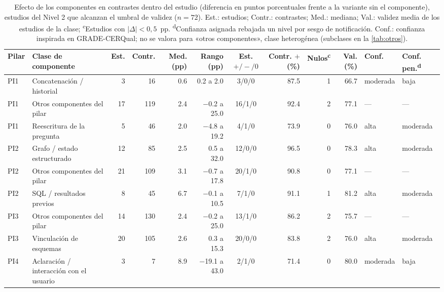 \begin{table}[!tbp]
\centering
\caption{Efecto de los componentes en contrastes dentro del estudio (diferencia en puntos porcentuales frente a la variante sin el componente), estudios del Nivel 2 que alcanzan el umbral de validez ($n = 72$). Est.: estudios; Contr.: contrastes; Med.: mediana; Val.: validez media de los estudios de la clase; \textsuperscript{c}Estudios con $|\Delta| < 0{,}5$~pp. \textsuperscript{d}Confianza asignada rebajada un nivel por sesgo de notificación. Conf.: confianza inspirada en GRADE-CERQual; no se valora para «otros componentes», clase heterogénea (subclases en la \cref{tab:otros}).}
\label{tab:efectos}
\footnotesize
\begin{tabularx}{\textwidth}{@{}l >{\raggedright\arraybackslash}X r r r r c r r r l l@{}}
\toprule
Pilar & Clase de componente & Est. & Contr. & Med. (pp) & Rango (pp) & Est. $+/-/0$ & Contr. $+$ (\%) & Nulos\textsuperscript{c} & Val. (\%) & Conf. & Conf. pen.\textsuperscript{d} \\
\midrule
PI1 & Concatenación / historial & 3 & 16 & \num{0.6} & \num{0.2} a \num{2.0} & 3/0/0 & \num{87.5} & 1 & \num{66.7} & moderada & baja \\
PI1 & Otros componentes del pilar & 17 & 119 & \num{2.4} & \num{-0.2} a \num{25.0} & 16/1/0 & \num{92.4} & 2 & \num{77.1} & --- & --- \\
PI1 & Reescritura de la pregunta & 5 & 46 & \num{2.0} & \num{-4.8} a \num{19.2} & 4/1/0 & \num{73.9} & 0 & \num{76.0} & alta & moderada \\
\addlinespace
PI2 & Grafo / estado estructurado & 12 & 85 & \num{2.5} & \num{0.5} a \num{32.0} & 12/0/0 & \num{96.5} & 0 & \num{78.3} & alta & moderada \\
PI2 & Otros componentes del pilar & 21 & 109 & \num{3.1} & \num{-0.7} a \num{17.8} & 20/1/0 & \num{90.8} & 0 & \num{77.1} & --- & --- \\
PI2 & SQL / resultados previos & 8 & 45 & \num{6.7} & \num{-0.1} a \num{10.5} & 7/1/0 & \num{91.1} & 1 & \num{81.2} & alta & moderada \\
\addlinespace
PI3 & Otros componentes del pilar & 14 & 130 & \num{2.4} & \num{-0.2} a \num{25.0} & 13/1/0 & \num{86.2} & 2 & \num{75.7} & --- & --- \\
PI3 & Vinculación de esquemas & 20 & 105 & \num{2.6} & \num{0.3} a \num{15.3} & 20/0/0 & \num{83.8} & 2 & \num{76.0} & alta & moderada \\
\addlinespace
PI4 & Aclaración / interacción con el usuario & 3 & 7 & \num{8.9} & \num{-19.1} a \num{43.0} & 2/1/0 & \num{71.4} & 0 & \num{80.0} & moderada & baja \\

\end{tabularx}
\end{table}
